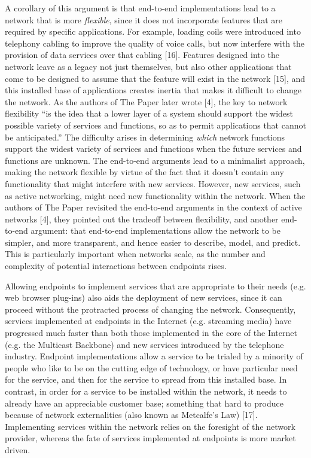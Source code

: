 \documentclass[a4paper,11pt,notitlepage,twoside,openright]{article}
\begin{document}
A corollary of this argument is that end-to-end implementations lead to
a network that is more \emph{flexible}, since it does not incorporate
features that are required by specific applications. For example,
loading coils were introduced into telephony cabling to improve the
quality of voice calls, but now interfere with the provision of data
services over that cabling {[}16{]}. Features designed into the network
leave as a legacy not just themselves, but also other applications that
come to be designed to assume that the feature will exist in the network
{[}15{]}, and this installed base of applications creates inertia that
makes it difficult to change the network. As the authors of The Paper
later wrote {[}4{]}, the key to network flexibility ``is the idea that a
lower layer of a system should support the widest possible variety of
services and functions, so as to permit applications that cannot be
anticipated.'' The difficulty arises in determining \emph{which} network
functions support the widest variety of services and functions when the
future services and functions are unknown. The end-to-end arguments lead
to a minimalist approach, making the network flexible by virtue of the
fact that it doesn't contain any functionality that might interfere with
new services. However, new services, such as active networking, might
need new functionality within the network. When the authors of The Paper
revisited the end-to-end arguments in the context of active networks
{[}4{]}, they pointed out the tradeoff between flexibility, and another
end-to-end argument: that end-to-end implementations allow the network
to be simpler, and more transparent, and hence easier to describe,
model, and predict. This is particularly important when networks scale,
as the number and complexity of potential interactions between endpoints
rises.

Allowing endpoints to implement services that are appropriate to their
needs (e.g. web browser plug-ins) also aids the deployment of new
services, since it can proceed without the protracted process of
changing the network. Consequently, services implemented at endpoints in
the Internet (e.g. streaming media) have progressed much faster than
both those implemented in the core of the Internet (e.g. the Multicast
Backbone) and new services introduced by the telephone industry.
Endpoint implementations allow a service to be trialed by a minority of
people who like to be on the cutting edge of technology, or have
particular need for the service, and then for the service to spread from
this installed base. In contrast, in order for a service to be installed
within the network, it needs to already have an appreciable customer
base; something that hard to produce because of network externalities
(also known as Metcalfe's Law) {[}17{]}. Implementing services within
the network relies on the foresight of the network provider, whereas the
fate of services implemented at endpoints is more market driven.
\end{document}
